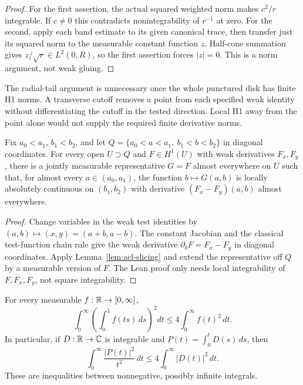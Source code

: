\begin{proof}
\leanok
For the first assertion, the actual squared weighted norm makes $c^2/r$
integrable. If $c\ne0$ this contradicts nonintegrability of $r^{-1}$ at zero.
For the second, apply each band estimate to its given canonical trace, then
transfer just its squared norm to the measurable constant function $z$.
Half-cone summation gives $z/\sqrt r\in L^2(0,R)$, so the first assertion
forces $|z|=0$. This is a norm argument, not weak gluing.
\end{proof}

\begin{remark}
The radial-tail argument is unnecessary once the whole punctured disk has
finite H1 norms. A transverse cutoff removes a point from each specified
weak identity without differentiating the cutoff in the tested direction.
Local H1 away from the point alone would not supply the required finite
derivative norms.
\end{remark}

\begin{lemma}
\label{lem:trace-acl}
\leanok
Fix $a_0<a_1$, $b_1<b_2$, and let
$Q=\{a_0<a<a_1,\ b_1<b<b_2\}$ in diagonal coordinates.
For every open $U\supset Q$ and $F\in H^1(U)$ with weak derivatives
$F_x,F_y$, there is a jointly measurable representative $G=F$ almost everywhere on $U$
such that, for almost every $a\in(a_0,a_1)$, the function $b\mapsto G(a,b)$
is locally absolutely continuous on $(b_1,b_2)$ with derivative
$(F_x-F_y)(a,b)$ almost everywhere.
\end{lemma}

\begin{proof}
\leanok
Change variables in the weak test identities by
$(a,b)\mapsto(x,y)=(a+b,a-b)$. The constant Jacobian and the classical
test-function chain rule give the weak derivative
$\partial_bF=F_x-F_y$ in diagonal coordinates. Apply
Lemma~\ref{lem:acl-slicing} and extend the representative off $Q$ by
a measurable version of $F$. The Lean proof only needs local integrability
of $F,F_x,F_y$, not square integrability.
\end{proof}

\begin{lemma}
\label{lem:hardy-average}
\leanok
For every measurable $f:\mathbb{R}\to[0,\infty]$,
\[
  \int_0^\infty\left(\int_0^1 f(ts)\,ds\right)^2dt
  \le 4\int_0^\infty f(t)^2\,dt .
\]
In particular, if $D:\mathbb{R}\to\mathbb{C}$ is integrable and
$P(t)=\int_0^tD(s)\,ds$, then
\[
  \int_0^\infty \frac{|P(t)|^2}{t^2}\,dt
  \le 4\int_0^\infty |D(t)|^2\,dt .
\]
These are inequalities between nonnegative, possibly infinite integrals.
\end{lemma}

